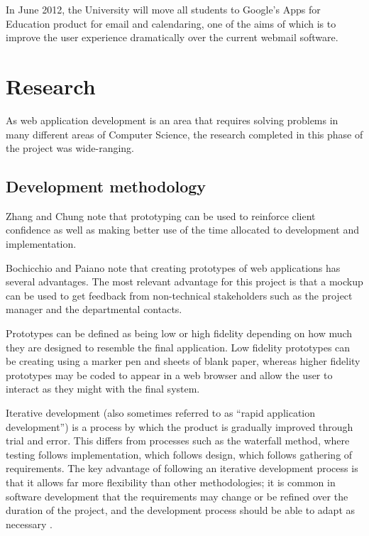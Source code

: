 \documentclass[]{scrartcl}
\begin{document}
In June 2012, the University will move all students to Google's Apps for
Education product for email and calendaring, one of the aims of which is to
improve the user experience dramatically over the current webmail software.

\section{Research}


As web application development is an area that requires solving problems in
many different areas of Computer Science, the research completed in this phase
of the project was wide-ranging.

\subsection{Development methodology}



Zhang and Chung \cite{MODFM_2003} note that prototyping can be used to
reinforce client confidence as well as making better use of the time allocated
to development and implementation.

Bochicchio and Paiano \cite{PrototypingWebApplications_2000} note that
creating prototypes of web applications has several advantages.
The most relevant advantage for this project is that a mockup can be used to
get feedback from non-technical stakeholders such as the project manager and
the departmental contacts.

Prototypes can be defined as being low or high fidelity depending on how much
they are designed to resemble the final application. Low fidelity prototypes
can be creating using a marker pen and sheets of blank paper, whereas higher
fidelity prototypes may be coded to appear in a web browser and allow the user
to interact as they might with the final system.


Iterative development (also sometimes referred to as ``rapid application
development'') is a process by which the product is gradually improved through
trial and error. This differs from processes such as the waterfall method,
where testing follows implementation, which follows design, which follows
gathering of requirements. The key advantage of following an iterative
development process is that it allows far more flexibility than other
methodologies; it is common in software development that the requirements may
change or be refined over the duration of the project, and the development
process should be able to adapt as necessary \cite{kuniavsky2003userexperience}.
\end{document}
